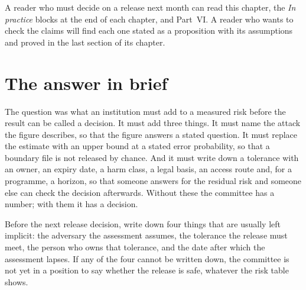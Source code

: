 A reader who must decide on a release next month can read this chapter, the \textit{In
practice} blocks at the end of each chapter, and Part~VI. A reader who wants to check the
claims will find each one stated as a proposition with its assumptions and proved in the last
section of its chapter.

\section{The answer in brief}

The question was what an institution must add to a measured risk before the result can be
called a decision. It must add three things. It must name the attack the figure describes, so
that the figure answers a stated question. It must replace the estimate with an upper bound
at a stated error probability, so that a boundary file is not released by chance. And it must
write down a tolerance with an owner, an expiry date, a harm class, a legal basis, an access
route and, for a programme, a horizon, so that someone answers for the residual risk and
someone else can check the decision afterwards. Without these the committee has a number;
with them it has a decision.

\begin{inpractice}
Before the next release decision, write down four things that are usually left implicit: the
adversary the assessment assumes, the tolerance the release must meet, the person who owns
that tolerance, and the date after which the assessment lapses. If any of the four cannot be
written down, the committee is not yet in a position to say whether the release is safe,
whatever the risk table shows.
\end{inpractice}
